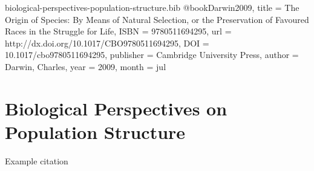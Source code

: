 \begin{bibunit}

\begin{filecontents*}[overwrite]{biological-perspectives-population-structure.bib}
@book{Darwin2009,
  title = {The Origin of Species: By Means of Natural Selection,  or the Preservation of Favoured Races in the Struggle for Life},
  ISBN = {9780511694295},
  url = {http://dx.doi.org/10.1017/CBO9780511694295},
  DOI = {10.1017/cbo9780511694295},
  publisher = {Cambridge University Press},
  author = {Darwin,  Charles},
  year = {2009},
  month = jul 
}
\end{filecontents*} 

\section{Biological Perspectives on Population Structure}
\label{sec:population-structure}

Example citation \citep{Darwin2009}

    
\end{bibunit}
